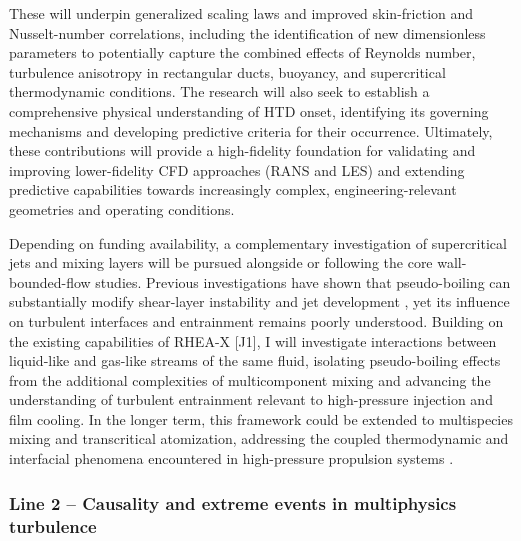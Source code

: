 \documentclass[11pt]{article}
\begin{document}
These will underpin generalized scaling laws and improved skin-friction and Nusselt-number correlations, including the identification of new dimensionless parameters to potentially capture the combined effects of Reynolds number, turbulence anisotropy in rectangular ducts, buoyancy, and supercritical thermodynamic conditions.
The research will also seek to establish a comprehensive physical understanding of HTD onset, identifying its governing mechanisms and developing predictive criteria for their occurrence.
Ultimately, these contributions will provide a high-fidelity foundation for validating and improving lower-fidelity CFD approaches (RANS and LES) and extending predictive capabilities towards increasingly complex, engineering-relevant geometries and operating conditions.

Depending on funding availability, a complementary investigation of supercritical jets and mixing layers will be pursued alongside or following the core wall-bounded-flow studies.
Previous investigations have shown that pseudo-boiling can substantially modify shear-layer instability and jet development \cite{Lapenna2019,SharanBellan2021}, yet its influence on turbulent interfaces and entrainment remains poorly understood.
Building on the existing capabilities of RHEA-X [J1], I will investigate interactions between liquid-like and gas-like streams of the same fluid, isolating pseudo-boiling effects from the additional complexities of multicomponent mixing and advancing the understanding of turbulent entrainment relevant to high-pressure injection and film cooling.
In the longer term, this framework could be extended to multispecies mixing and transcritical atomization, addressing the coupled thermodynamic and interfacial phenomena encountered in high-pressure propulsion systems \cite{JofreUrzay2021}.

\subsubsection{Line 2 -- Causality and extreme events in multiphysics turbulence}
\end{document}

